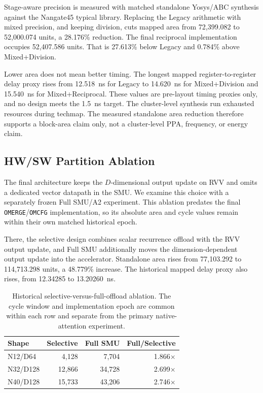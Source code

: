 \documentclass[journal]{IEEEtran}
\begin{document}
Stage-aware precision is measured with matched standalone Yosys/ABC synthesis
against the Nangate45 typical library. Replacing the Legacy arithmetic with
mixed precision, and keeping division, cuts mapped area from 72,399.082 to
52,000.074 units, a 28.176\% reduction. The final reciprocal implementation
occupies 52,407.586 units. That is 27.613\% below Legacy and 0.784\% above
Mixed+Division.

Lower area does not mean better timing. The longest mapped register-to-register
delay proxy rises from 12.518~ns for Legacy to 14.620~ns for Mixed+Division and
15.540~ns for Mixed+Reciprocal. These values are pre-layout timing proxies
only, and no design meets the 1.5~ns target. The cluster-level synthesis run
exhausted resources during techmap. The measured standalone area reduction
therefore supports a block-area claim only, not a cluster-level PPA, frequency,
or energy claim.

\subsection{HW/SW Partition Ablation}
The final architecture keeps the $D$-dimensional output update on RVV and omits
a dedicated vector datapath in the SMU. We examine this choice with a separately
frozen Full SMU/A2 experiment. This ablation predates the final \texttt{OMERGE}/\texttt{OMCFG}
implementation, so its absolute area and cycle values remain within their own
matched historical epoch.

There, the selective design combines scalar recurrence offload with the RVV
output update, and Full SMU additionally moves the dimension-dependent output
update into the accelerator. Standalone area rises from 77,103.292 to
114,713.298 units, a 48.779\% increase. The historical mapped delay proxy also
rises, from 12.34285 to 13.20260~ns.

\begin{table}[t]
\centering
\caption{Historical selective-versus-full-offload ablation. The cycle window
and implementation epoch are common within each row and separate from the
primary native-attention experiment.}
\label{tab:full_smu_ablation}
\scriptsize
\setlength{\tabcolsep}{4pt}
\begin{tabular}{@{}lrrr@{}}
\toprule
Shape & Selective & Full SMU & Full/Selective \\
\midrule
N12/D64  & 4,128  & 7,704  & 1.866$\times$ \\
N32/D128 & 12,866 & 34,728 & 2.699$\times$ \\
N40/D128 & 15,733 & 43,206 & 2.746$\times$ \\
\bottomrule
\end{tabular}
\end{table}
\end{document}
